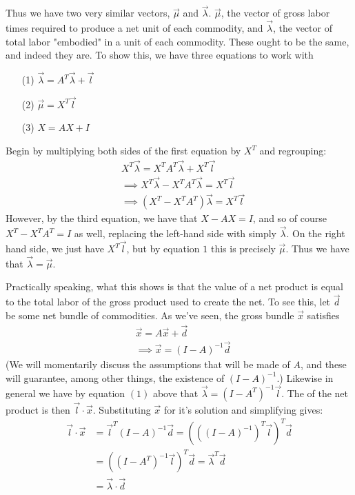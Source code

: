 \documentclass{article}
\theoremstyle{definition}
\theoremstyle{plain}
\theoremstyle{theorem}
\begin{document}
Thus we have two very similar vectors, $\vec{\mu}$ and $\vec{\lambda}$. $\vec{\mu}$, the vector of gross labor times required to produce a net unit of each commodity, and $\vec{\lambda}$, the vector of total labor "embodied" in a unit of each commodity. These ought to be the same, and indeed they are. To show this, we have three equations to work with
\begin{itemize}
	\item[(1)] $\vec{\lambda} = A^T\vec{\lambda}+\vec{l}$
	\item[(2)] $\vec{\mu} = X^T\vec{l}$
	\item[(3)] $X = AX + I$
\end{itemize}
Begin by multiplying both sides of the first equation by $X^T$ and regrouping:
\begin{align*}
	& X^T\vec{\lambda} = X^TA^T\vec{\lambda} + X^T\vec{l} \\
	&\implies X^T\vec{\lambda} - X^TA^T\vec{\lambda} = X^T\vec{l} \\
	&\implies (X^T-X^TA^T)\vec{\lambda} = X^T\vec{l}
\end{align*}
However, by the third equation, we have that $X-AX = I$, and so of course $X^T - X^TA^T = I$ as well, replacing the left-hand side with simply $\vec{\lambda}$. On the right hand side, we just have $X^T\vec{l}$, but by equation $1$ this is precisely $\vec{\mu}$. Thus we have that $\vec{\lambda} = \vec{\mu}$. \par 
Practically speaking, what this shows is that the value of a net product is equal to the total labor of the gross product used to create the net. To see this, let $\vec{d}$ be some net bundle of commodities. As we've seen, the gross bundle $\vec{x}$ satisfies 
\begin{align*} 
	& \vec{x} = A\vec{x} + \vec{d} \\
	&\implies \vec{x} = (I-A)^{-1}\vec{d}
\end{align*}
(We will momentarily discuss the assumptions that will be made of $A$, and these will guarantee, among other things, the existence of $(I-A)^{-1}$.) Likewise in general we have by equation $(1)$ above that $\vec{\lambda} = (I-A^T)^{-1}\vec{l}$. The of the net product is then $\vec{l} \cdot \vec{x}$. Substituting $\vec{x}$ for it's solution and simplifying gives:
\begin{align*}
	\vec{l} \cdot \vec{x} &= \vec{l}^T(I-A)^{-1}\vec{d} = (((I-A)^{-1})^T\vec{l})^T\vec{d}\\
		&= ((I-A^T)^{-1}\vec{l})^T\vec{d} = \vec{\lambda}^T \vec{d} \\
		&= \vec{\lambda} \cdot \vec{d}
\end{align*}
\end{document}
